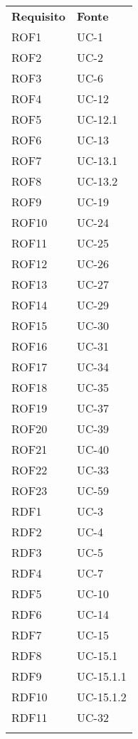 \newpage
\begin{longtable}{| p{5cm} | p{5cm} |}
		\rowcolor{LightBlue}
		\color{white}\bfseries Requisito & \color{white}\bfseries Fonte \\[0.25cm]
		\rowcolor{LightGray}
		ROF1 & UC-1\\
		ROF2 & UC-2\\
		\rowcolor{LightGray}
		ROF3 & UC-6\\
		ROF4 & UC-12\\
		\rowcolor{LightGray}
		ROF5 & UC-12.1\\
		ROF6 & UC-13\\
		\rowcolor{LightGray}
		ROF7 & UC-13.1\\
		ROF8 & UC-13.2\\
		\rowcolor{LightGray}
		ROF9 & UC-19\\
		ROF10 & UC-24\\
		\rowcolor{LightGray}
		ROF11 & UC-25\\
		ROF12 & UC-26\\
		\rowcolor{LightGray}
		ROF13 & UC-27\\
		ROF14 & UC-29\\
		\rowcolor{LightGray}
		ROF15 & UC-30\\
		ROF16 & UC-31\\
		\rowcolor{LightGray}
		ROF17 & UC-34\\
		ROF18 & UC-35\\
		\rowcolor{LightGray}
		ROF19 & UC-37\\
		ROF20 & UC-39\\
		\rowcolor{LightGray}
		ROF21 & UC-40\\
		ROF22 & UC-33\\
		\rowcolor{LightGray}
		ROF23 & UC-59\\
		RDF1 & UC-3\\
		\rowcolor{LightGray}
		RDF2 & UC-4\\
		RDF3 & UC-5\\
		\rowcolor{LightGray}
		RDF4 & UC-7\\
		RDF5 & UC-10\\
		\rowcolor{LightGray}
		RDF6 & UC-14\\
		RDF7 & UC-15\\
		\rowcolor{LightGray}
		RDF8 & UC-15.1\\
		RDF9 & UC-15.1.1\\
		\rowcolor{LightGray}
		RDF10 & UC-15.1.2\\
		RDF11 & UC-32\\
		\rowcolor{LightGray}

\end{longtable}
